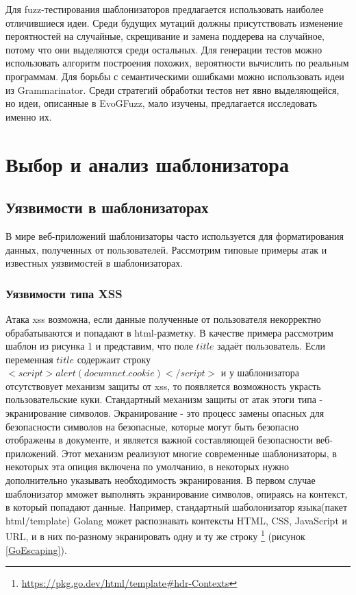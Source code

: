 \documentclass[a4paper]{article}
\begin{document}
Для fuzz-тестирования шаблонизаторов предлагается использовать наиболее отличившиеся идеи. Среди будущих мутаций должны присутствовать изменение пероятностей на случайные, скрещивание и замена поддерева на случайное, потому что они выделяются среди остальных. Для генерации тестов можно использовать алгоритм построения похожих, вероятности вычислить по реальным программам. Для борьбы с семантическими ошибками можно использовать идеи из Grammarinator. Среди стратегий обработки тестов нет явно выделяющейся, но идеи, описанные в EvoGFuzz, мало изучены, предлагается исследовать именно их.

\newpage
\section{Выбор и анализ шаблонизатора}
\indent

\subsection{Уязвимости в шаблонизаторах}
\indent

В мире веб-приложений шаблонизаторы часто используется для форматирования данных, полученных от пользователей. Рассмотрим типовые примеры атак и известных уязвимостей в шаблонизаторах.

\subsubsection{Уязвимости типа XSS}

Атака xss возможна, если данные полученные от пользователя некорректно обрабатываются и попадают в html-разметку. В качестве примера рассмотрим шаблон из рисунка 1 и представим, что поле $title$ задаёт пользователь. Если переменная $title$ содержаит строку $<script>alert(documnet.cookie)</script>$ и у шаблонизатора отсутствовует механизм защиты от xss, то появляется возможность украсть пользовательские куки. Стандартный механизм защиты от атак этоги типа - экранирование символов. Экранирование - это процесс замены опасных для безопасности символов на безопасные, которые могут быть безопасно отображены в документе, и является важной составляющей безопасности веб-приложений. Этот механизм реализуют многие современные шаблонизаторы, в некоторых эта опиция включена по умолчанию, в некоторых нужно дополнительно указывать необходимость экранирования. В первом случае шаблонизатор мможет выполнять экранирование символов, опираясь на контекст, в который попадают данные. Например, стандартный шаболонизатор языка(пакет html/template) Golang может распознавать контексты HTML, CSS, JavaScript и URL, и в них по-разному экранировать одну и ту же строку \footnote{\href{https://pkg.go.dev/html/template\#hdr-Contexts}{https://pkg.go.dev/html/template\#hdr-Contexts}} (рисунок \ref{GoEscaping}).
\end{document}
